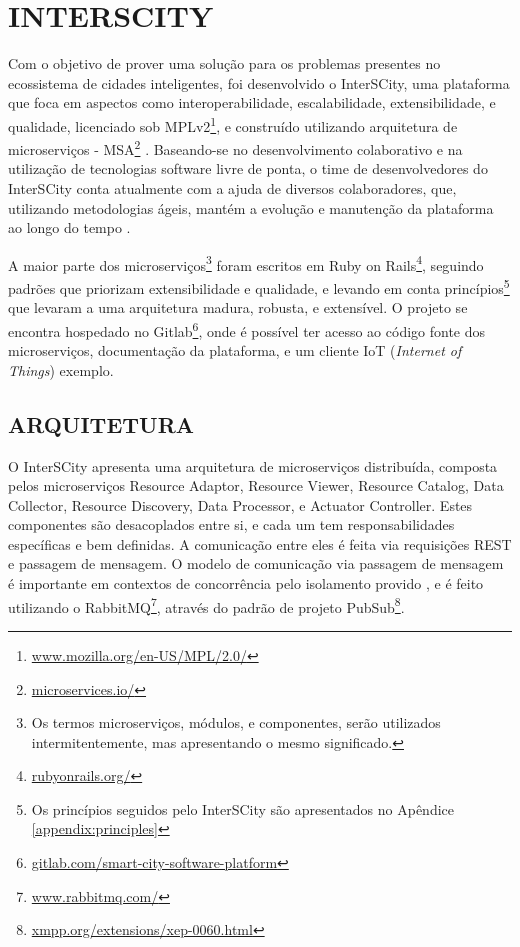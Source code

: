 \chapter[INTERSCITY]{INTERSCITY}
\label{chapter:interscity}

Com o objetivo de prover uma solução para os problemas presentes no ecossistema
de cidades inteligentes, foi desenvolvido o InterSCity, uma plataforma que foca
em aspectos como interoperabilidade, escalabilidade, extensibilidade, e
qualidade, licenciado sob MPLv2\footnote{\url{www.mozilla.org/en-US/MPL/2.0/}},
e construído utilizando arquitetura de microserviços -
MSA\footnote{\url{microservices.io/}} \cite{delesposte2017}. Baseando-se no
desenvolvimento colaborativo e na utilização de tecnologias software livre de
ponta, o time de desenvolvedores do InterSCity conta atualmente com a ajuda de
diversos colaboradores, que, utilizando metodologias ágeis, mantém a evolução e
manutenção da plataforma ao longo do tempo \cite{delesposte2017}.

A maior parte dos microserviços\footnote{Os termos microserviços, módulos, e
componentes, serão utilizados intermitentemente, mas apresentando o mesmo
significado.} foram escritos em Ruby on Rails\footnote{\url{rubyonrails.org/}},
seguindo padrões que priorizam extensibilidade e qualidade, e levando em conta
princípios\footnote{Os princípios seguidos pelo InterSCity são apresentados no
Apêndice \ref{appendix:principles}} que levaram a uma arquitetura madura, robusta, e extensível. O
projeto se encontra hospedado no
Gitlab\footnote{\url{gitlab.com/smart-city-software-platform}}, onde é
possível ter acesso ao código fonte dos microserviços, documentação da
plataforma, e um cliente IoT (\textit{Internet of Things}) exemplo.

\section{ARQUITETURA}

O InterSCity apresenta uma arquitetura de microserviços distribuída, composta
pelos microserviços Resource Adaptor, Resource Viewer,
Resource Catalog, Data Collector, Resource Discovery, Data Processor, e
Actuator Controller. Estes componentes são desacoplados entre si, e cada um tem
responsabilidades específicas e bem definidas. A comunicação entre eles é
feita via requisições REST e passagem de mensagem. O modelo de comunicação via
passagem de mensagem é importante em contextos de concorrência pelo isolamento
provido \cite{armstrong2003}, e é feito utilizando o
RabbitMQ\footnote{\url{www.rabbitmq.com/}}, através do padrão de projeto
PubSub\footnote{\url{xmpp.org/extensions/xep-0060.html}}.

